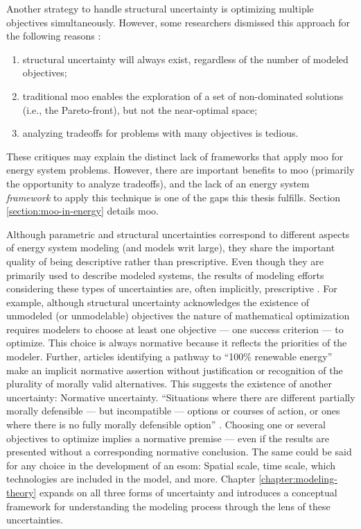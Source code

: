 Another strategy to handle structural uncertainty is optimizing multiple
objectives simultaneously. However, some researchers dismissed this approach for
the following reasons \cite{decarolis_using_2011}:
\begin{enumerate}
    \item structural uncertainty will always exist, regardless of the number of
    modeled objectives;
    \item traditional \ac{moo} enables the exploration of a set of non-dominated
    solutions (i.e., the Pareto-front), but not the near-optimal space;
    \item analyzing tradeoffs for problems with many objectives is tedious.
\end{enumerate}
These critiques may explain the distinct lack of frameworks that apply \ac{moo}
for energy system problems. However, there are important benefits to \ac{moo}
(primarily the opportunity to analyze tradeoffs), and the lack of an energy
system \textit{framework} to apply this technique is one of the gaps this thesis
fulfills. Section \ref{section:moo-in-energy} details \acl{moo}.

Although parametric and structural uncertainties correspond to different aspects
of energy system modeling (and models writ large), they share the important
quality of being descriptive rather than prescriptive. Even though they are
primarily used to describe modeled systems, the results of modeling efforts
considering these types of uncertainties are, often implicitly, prescriptive
\cite{yue_least_2020,decarolis_nc_2018,cochran_la100_2021,bussar_optimal_2014}.
For example, although structural uncertainty acknowledges the existence of
unmodeled (or unmodelable) objectives the nature of mathematical optimization
requires modelers to choose at least one objective --- one success criterion ---
to optimize. This choice is always normative because it reflects the priorities
of the modeler. Further, articles identifying a pathway to ``100\% renewable
energy'' make an implicit normative assertion without justification or
recognition of the plurality of morally valid alternatives. This suggests the
existence of another uncertainty: Normative uncertainty. ``Situations where
there are different partially morally defensible --- but incompatible ---
options or courses of action, or ones where there is no fully morally defensible
option'' \cite{taebi_bridging_2017,van_uffelen_revisiting_2024}. Choosing one or
several objectives to optimize implies a normative premise --- even if the
results are presented without a corresponding normative conclusion. The same
could be said for any choice in the development of an \ac{esom}: Spatial scale,
time scale, which technologies are included in the model, and more. Chapter
\ref{chapter:modeling-theory} expands on all three forms of uncertainty and
introduces a conceptual framework for understanding the modeling process through
the lens of these uncertainties. 


